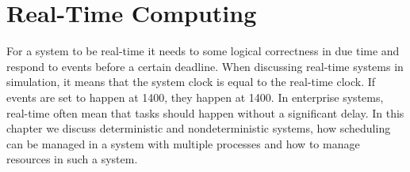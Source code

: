 \chapter{Real-Time Computing} \label{ch:realTimeComputing}

For a system to be real-time it needs to some logical correctness in due time and respond to events before a certain deadline. When discussing real-time systems in simulation, it means that the system clock is equal to the real-time clock. If events are set to happen at 1400, they happen at 1400. In enterprise systems, real-time often mean that tasks should happen without a significant delay. In this chapter we discuss deterministic and nondeterministic systems, how scheduling can be managed in a system with multiple processes and how to manage resources in such a system.



